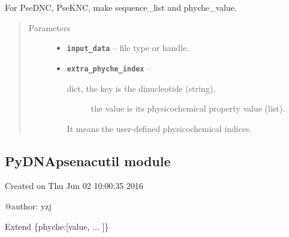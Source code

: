 \documentclass[letterpaper,10pt,english]{sphinxmanual}
\begin{document}
\begin{fulllineitems}
\label{reference/PyDNApsenac:PyDNApsenac.GetSequenceListAndPhycheValuePseknc}
For PseDNC, PseKNC, make sequence\_list and phyche\_value.
\begin{quote}\begin{description}
\item[{Parameters}] \leavevmode\begin{itemize}
\item {} 
\textbf{\texttt{input\_data}} -- file type or handle.

\item {} 
\textbf{\texttt{extra\_phyche\_index}} -- \begin{description}
\item[{dict, the key is the dinucleotide (string),}] \leavevmode
the value is its physicochemical property value (list).

\end{description}

It means the user-defined physicochemical indices.


\end{itemize}

\end{description}\end{quote}

\end{fulllineitems}



\subsection{PyDNApsenacutil module}
\label{reference/PyDNApsenacutil::doc}\label{reference/PyDNApsenacutil:pydnapsenacutil-module}\label{reference/PyDNApsenacutil:module-PyDNApsenacutil}
Created on Thu Jun 02 10:00:35 2016

@author: yzj

\begin{fulllineitems}
\label{reference/PyDNApsenacutil:PyDNApsenacutil.ExtendPhycheIndex}
Extend \{phyche:{[}value, ... {]}\}

\end{fulllineitems}
\end{document}
